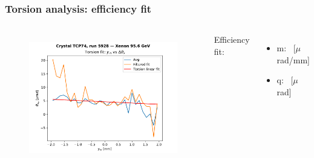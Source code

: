 \documentclass[10pt]{beamer}
\begin{document}
\begin{frame}
\frametitle{Torsion analysis: efficiency fit}

\begin{columns}[c] %

\begin{figure}
\includegraphics[width=\linewidth]{torsion_fit.pdf}\\
\end{figure}

Efficiency fit:
\begin{itemize}[leftmargin=*]
 \item m: \torsionm\ [$\mu$rad/mm]
 \item q: \torsionq\ [$\mu$rad]
\end{itemize}


\end{columns}
\end{frame}
\end{document}
